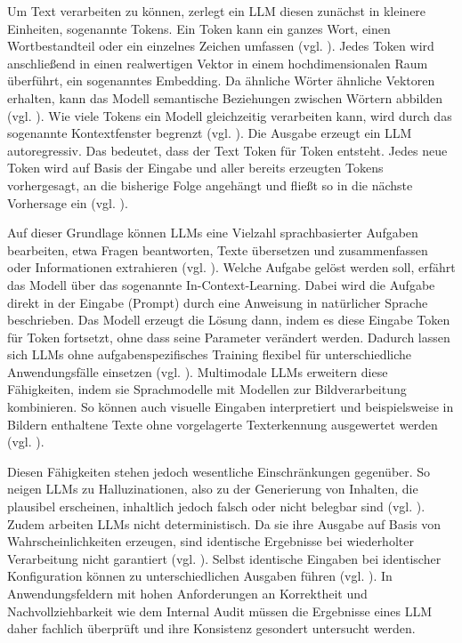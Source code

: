 Um Text verarbeiten zu können, zerlegt ein \ac{LLM} diesen zunächst in kleinere Einheiten, sogenannte Tokens. Ein Token kann ein ganzes Wort, einen Wortbestandteil oder ein einzelnes Zeichen umfassen (vgl. \cite[S.~1715~f.]{sennrich2016neural}). Jedes Token wird anschließend in einen realwertigen Vektor in einem hochdimensionalen Raum überführt, ein sogenanntes Embedding. Da ähnliche Wörter ähnliche Vektoren erhalten, kann das Modell semantische Beziehungen zwischen Wörtern abbilden (vgl. \cite[S. 1137 ff.]{bengio2003neural}). Wie viele Tokens ein Modell gleichzeitig verarbeiten kann, wird durch das sogenannte Kontextfenster begrenzt (vgl. \cite[S.~157~f.]{liu2024lost}). Die Ausgabe erzeugt ein \ac{LLM} autoregressiv. Das bedeutet, dass der Text Token für Token entsteht. Jedes neue Token wird auf Basis der Eingabe und aller bereits erzeugten Tokens vorhergesagt, an die bisherige Folge angehängt und fließt so in die nächste Vorhersage ein (vgl. \cite[S.~1138]{bengio2003neural}).

Auf dieser Grundlage können \acp{LLM} eine Vielzahl sprachbasierter Aufgaben bearbeiten, etwa Fragen beantworten, Texte übersetzen und zusammenfassen oder Informationen extrahieren (vgl. \cite[S.~1]{zhao2023survey}). Welche Aufgabe gelöst werden soll, erfährt das Modell über das sogenannte In-Context-Learning. Dabei wird die Aufgabe direkt in der Eingabe (Prompt) durch eine Anweisung in natürlicher Sprache beschrieben. Das Modell erzeugt die Lösung dann, indem es diese Eingabe Token für Token fortsetzt, ohne dass seine Parameter verändert werden. Dadurch lassen sich \acp{LLM} ohne aufgabenspezifisches Training flexibel für unterschiedliche Anwendungsfälle einsetzen (vgl. \cite[S.~1877~f.]{brown2020language}). Multimodale \acp{LLM} erweitern diese Fähigkeiten, indem sie Sprachmodelle mit Modellen zur Bildverarbeitung kombinieren. So können auch visuelle Eingaben interpretiert und beispielsweise in Bildern enthaltene Texte ohne vorgelagerte Texterkennung ausgewertet werden (vgl. \cite[S.~1]{yin2024survey}).

Diesen Fähigkeiten stehen jedoch wesentliche Einschränkungen gegenüber. So neigen \acp{LLM} zu Halluzinationen, also zu der Generierung von Inhalten, die plausibel erscheinen, inhaltlich jedoch falsch oder nicht belegbar sind (vgl. \cites[S.~2]{ji2023hallucination}[S.~1~f.]{huang2025survey}). Zudem arbeiten \acp{LLM} nicht deterministisch. Da sie ihre Ausgabe auf Basis von Wahrscheinlichkeiten erzeugen, sind identische Ergebnisse bei wiederholter Verarbeitung nicht garantiert (vgl. \cite[S.~5, 12]{huang2025survey}). Selbst identische Eingaben bei identischer Konfiguration können zu unterschiedlichen Ausgaben führen (vgl. \cite[S.~1]{ouyang2025empirical}). In Anwendungsfeldern mit hohen Anforderungen an Korrektheit und Nachvollziehbarkeit wie dem Internal Audit müssen die Ergebnisse eines \ac{LLM} daher fachlich überprüft und ihre Konsistenz gesondert untersucht werden.

